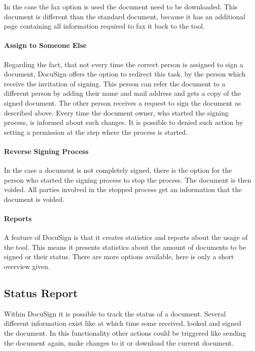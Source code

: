 In the case the fax option is used the document need to be downloaded. This document is different than the standard document, because it has an additional page containing all information required to fax it back to the tool. 

\paragraph{Assign to Someone Else}
Regarding the fact, that not every time the correct person is assigned to sign a document, DocuSign offers the option to redirect this task, by the person which receive the invitation of signing. This person can refer the document to a different person by adding their name and mail address and gets a copy of the signed document. The other person receives a request to sign the document as described above. Every time the document owner, who started the signing process, is informed about such changes.
It is possible to denied such action by setting a permission at the step where the process is started. 

\paragraph{Reverse Signing Process}
In the case a document is not completely signed, there is the option for the person who started the signing process to stop the process. The document is then voided. All parties involved in the stopped process get an information that the document is voided.

\paragraph{Reports}
A feature of DocuSign is that it creates statistics and reports about the usage of the tool. This means it presents statistics about the amount of documents to be signed or their status. There are more options available, here is only a short overview given.

\subsection{Status Report}
Within DocuSign it is possible to track the status of a document. Several different information exist like at which time some received, looked and signed the document. In this functionality other actions could be triggered like sending the document again, make changes to it or download the current document.


